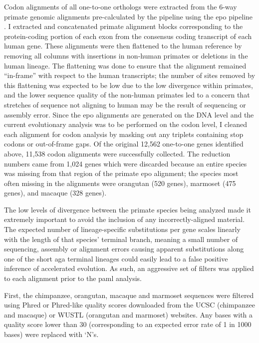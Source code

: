 Codon alignments of all one-to-one orthologs were extracted from the
6-way primate genomic alignments pre-calculated by the \ens pipeline
using the \ac{epo} pipeline \citep{Paten2008a,Paten2008}. I extracted
and concatenated primate alignment blocks corresponding to the
protein-coding portion of each exon from the consensus coding
transcript of each human gene. These alignments were then flattened to
the human reference by removing all columns with insertions in
non-human primates or deletions in the human lineage. The flattening
was done to ensure that the alignment remained ``in-frame'' with
respect to the human transcripts; the number of sites removed by this
flattening was expected to be low due to the low divergence within
primates, and the lower sequence quality of the non-human primates led
to a concern that stretches of sequence not aligning to human may be
the result of sequencing or assembly error. Since the \ac{epo}
alignments are generated on the DNA level and the current evolutionary
analysis was to be performed on the codon level, I cleaned each
alignment for codon analysis by masking out any triplets containing
stop codons or out-of-frame gaps. Of the original 12,562 one-to-one
genes identified above, 11,538 codon alignments were successfully
collected. The reduction numbers came from 1,024 genes which were
discarded because an entire species was missing from that region of
the primate \ac{epo} alignment; the species most often missing in the
alignments were orangutan (520 genes), marmoset (475 genes), and
macaque (328 genes).

The low levels of divergence between the primate species being
analyzed made it extremely important to avoid the inclusion of any
incorrectly-aligned material. The expected number of lineage-specific
substitutions per gene scales linearly with the length of that
species' terminal branch, meaning a small number of sequencing,
assembly or alignment errors causing apparent \nsyn substitutions
along one of the short \ac{aga} terminal lineages could easily lead to
a false positive inference of accelerated evolution. As such, an
aggressive set of filters was applied to each alignment prior to the
\ac{paml} analysis.

First, the chimpanzee, orangutan, macaque and marmoset sequences were
filtered using Phred or Phred-like quality scores downloaded from the
UCSC (chimpanzee and macaque) or WUSTL (orangutan and marmoset)
websites. Any bases with a quality score lower than 30 (corresponding
to an expected error rate of 1 in 1000 bases) were replaced with `N's.

